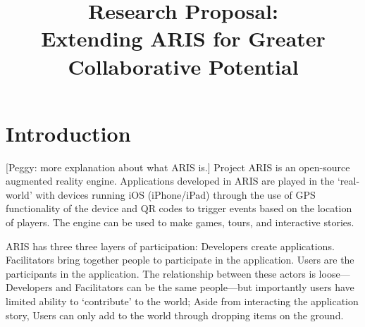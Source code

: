 \documentclass{sigchi}
\begin{document}
\title{Research Proposal: \\Extending ARIS for Greater Collaborative Potential}

\author{%
}

\maketitle

\begin{abstract}

\end{abstract}


\section{Introduction}

[Peggy: more explanation about what ARIS is.]
Project ARIS is an open-source augmented reality engine. Applications developed in ARIS are played in the ‘real-world’ with devices running iOS (iPhone/iPad) through the use of GPS functionality of the device and QR codes to trigger events based on the location of players. The engine can be used to make games, tours, and interactive stories. 

ARIS has three three layers of participation: Developers create applications. Facilitators bring together people to participate in the application. Users are the participants in the application. The relationship between these actors is loose---Developers and Facilitators can be the same people---but importantly users have limited ability to ‘contribute’ to the world; Aside from interacting the application story, Users can only add to the world through dropping items on the ground.
\end{document}
